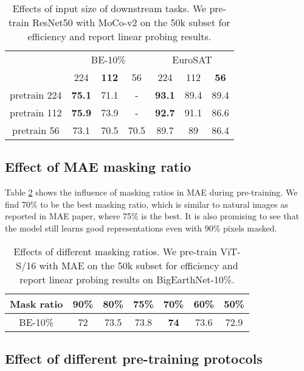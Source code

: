 \documentclass[lettersize,journal]{IEEEtran}
\begin{document}
\begin{table}[h!]
\centering
\caption{Effects of input size of downstream tasks. We pre-train ResNet50 with MoCo-v2 on the 50k subset for efficiency and report linear probing results.}
\begin{tabular}{ccccccc}
\hline
             & \multicolumn{3}{c}{BE-10\%} & \multicolumn{3}{c}{EuroSAT}                      \\
             & 224     & \textbf{112}     & 56      & 224                & 112  & \textbf{56} \\ \hline \hline
pretrain 224 & \textbf{75.1}             & 71.1    & -       & \textbf{93.1} & 89.4 & 89.4        \\
pretrain 112 & \textbf{75.9}             & 73.9    & -       & \textbf{92.7} & 91.1 & 86.6        \\
pretrain 56  & 73.1             & 70.5    & 70.5    & 89.7                        & 89   & 86.4        \\ \hline
\end{tabular}
\label{tab:input-size}
\end{table}

\subsection{\textbf{Effect of MAE masking ratio}} Table \ref{tab:mask-ratio} shows the influence of masking ratios in MAE during pre-training. We find 70\% to be the best masking ratio, which is similar to natural images as reported in MAE paper, where 75\% is the best. It is also promising to see that the model still learns good representations even with 90\% pixels masked. 


\begin{table}[h!]
\centering
\caption{Effects of different masking ratios. We pre-train ViT-S/16 with MAE on the 50k subset for efficiency and report linear probing results on BigEarthNet-10\%.}
\begin{tabular}{ccccccc}
\hline
Mask ratio & 90\% & 80\%  & 75\%  & 70\%         & 60\%  & 50\%  \\ \hline \hline
BE-10\% & 72  & 73.5 & 73.8 & \textbf{74} & 73.6 & 72.9 \\ \hline
\end{tabular}
\label{tab:mask-ratio}
\end{table}


\subsection{\textbf{Effect of different pre-training protocols}}
\end{document}

